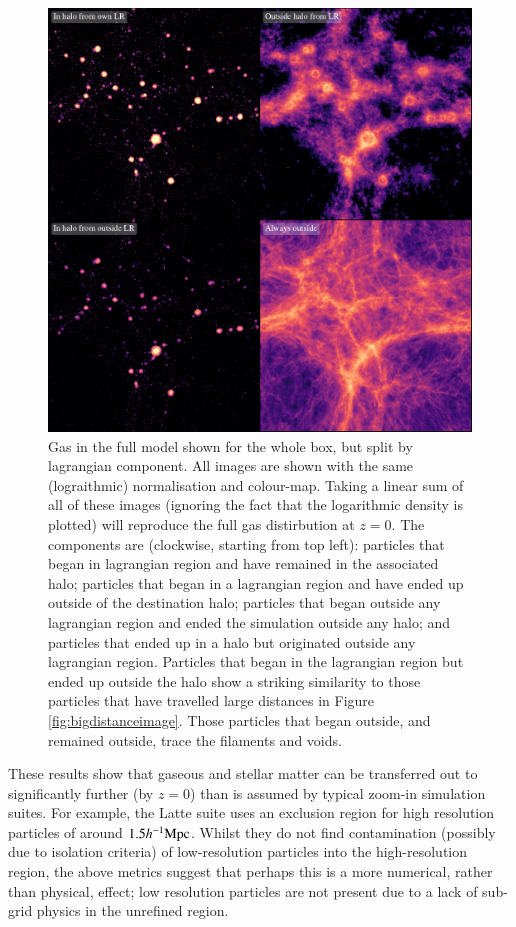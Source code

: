 \begin{figure}
    \centering
    \vspace{1cm}
    \includegraphics{figures/s50j7kAHF/four_images_magma_AHF.pdf}
    \caption{Gas in the \simba{} full model shown for the whole box, but
    split by lagrangian component. All images are shown with the same
    (lograithmic) normalisation and colour-map. Taking a linear sum of all of
    these images (ignoring the fact that the logarithmic density is plotted)
    will reproduce the full gas distirbution at $z=0$. The components are
    (clockwise, starting from top left): particles that began in lagrangian
    region and have remained in the associated halo; particles that began in
    a lagrangian region and have ended up outside of the destination halo;
    particles that began outside any lagrangian region and ended the
    simulation outside any halo; and particles that ended up in a halo but
    originated outside any lagrangian region. Particles that began in the
    lagrangian region but ended up outside the halo show a striking
    similarity to those particles that have travelled large distances in
    Figure \ref{fig:bigdistanceimage}. Those particles that began outside,
    and remained outside, trace the filaments and voids.}
    \vspace{1cm}
    \label{fig:lrtransfer}
\end{figure}

These results show that gaseous and stellar matter can be transferred out to
significantly further (by $z=0$) than is assumed by typical zoom-in
simulation suites. For example, the Latte \citep{Wetzel2016} suite uses an
exclusion region for high resolution particles of around $1.5 h^{-1}{\rm Mpc}{}$.
Whilst they do not find contamination (possibly due to isolation criteria) of
low-resolution particles into the high-resolution region, the above metrics
suggest that perhaps this is a more numerical, rather than physical, effect;
low resolution particles are not present due to a lack of sub-grid physics in
the unrefined region.
